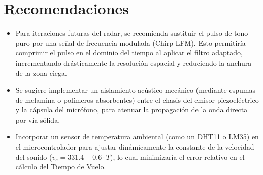 \documentclass[conference]{IEEEtran}
\begin{document}
\section{Recomendaciones}
\begin{itemize}
    \item Para iteraciones futuras del radar, se recomienda sustituir el pulso de tono puro por una señal de frecuencia modulada (Chirp LFM). Esto permitiría comprimir el pulso en el dominio del tiempo al aplicar el filtro adaptado, incrementando drásticamente la resolución espacial y reduciendo la anchura de la zona ciega.
    \item Se sugiere implementar un aislamiento acústico mecánico (mediante espumas de melamina o polímeros absorbentes) entre el chasis del emisor piezoeléctrico y la cápsula del micrófono, para atenuar la propagación de la onda directa por vía sólida.
    \item Incorporar un sensor de temperatura ambiental (como un DHT11 o LM35) en el microcontrolador para ajustar dinámicamente la constante de la velocidad del sonido ($v_s = 331.4 + 0.6 \cdot T$), lo cual minimizaría el error relativo en el cálculo del Tiempo de Vuelo.
\end{itemize}



\end{document}
